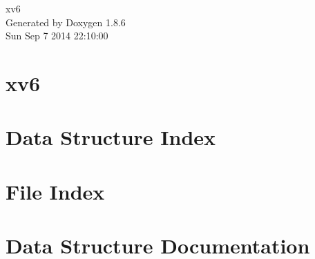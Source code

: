 \documentclass[twoside]{book}
\newcommand{\clearemptydoublepage}{%
  \newpage{\pagestyle{empty}\cleardoublepage}%
}
\begin{document}
\hypersetup{pageanchor=false}
\begin{titlepage}
\vspace*{7cm}
\begin{center}%
{\Large xv6 }\\
\vspace*{1cm}
{\large Generated by Doxygen 1.8.6}\\
\vspace*{0.5cm}
{\small Sun Sep 7 2014 22:10:00}\\
\end{center}
\end{titlepage}
\clearemptydoublepage
\tableofcontents
\clearemptydoublepage
{}
\hypersetup{pageanchor=true}

\chapter{xv6}
\label{md__r_e_a_d_m_e}
\hypertarget{md__r_e_a_d_m_e}{}

\chapter{Data Structure Index}

\chapter{File Index}

\chapter{Data Structure Documentation}
































\end{document}
